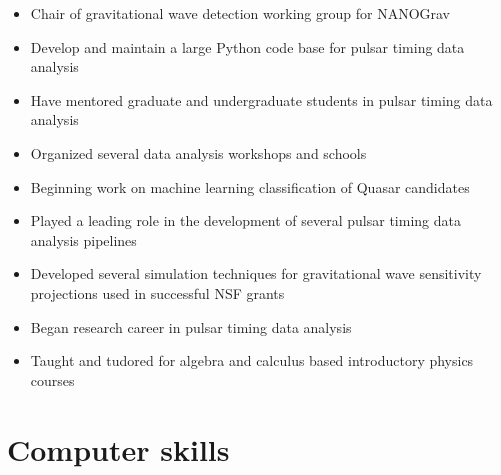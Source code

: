 \documentclass[11pt,letterpaper,sans]{moderncv} %
\begin{document}
\begin{itemize}
\item Chair of gravitational wave detection working group for NANOGrav
\item Develop and maintain a large Python code base for pulsar timing data analysis
\item Have mentored graduate and undergraduate students in pulsar timing data analysis
\item Organized several data analysis workshops and schools
\item Beginning work on machine learning classification of Quasar candidates
\end{itemize}
\vspace{6pt}

\begin{itemize}
\item Played a leading role in the development of several pulsar timing data analysis pipelines
\item Developed several simulation techniques for gravitational wave sensitivity projections used in successful NSF grants
\end{itemize}
\vspace{6pt}

\begin{itemize}
\item Began research career in pulsar timing data analysis
\item Taught and tudored for algebra and calculus based introductory physics courses

\end{itemize}


\section{Computer skills}
\vspace{6pt}

\end{document}
